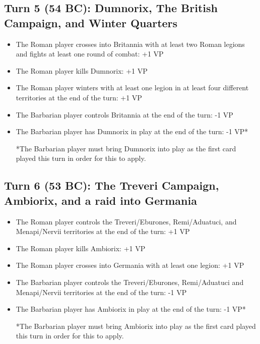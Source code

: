 \subsection{Turn 5 (54 BC): Dumnorix, The British Campaign, and Winter Quarters}
\begin{itemize}
  \setlength\itemsep{0em}
  \item The Roman player crosses into Britannia with at least two Roman legions and fights at least one round of combat: +1 VP
  \item The Roman player kills Dumnorix: +1 VP
  \item The Roman player winters with at least one legion in at least four different territories at the end of the turn: +1 VP
  \item The Barbarian player controls Britannia at the end of the turn: -1 VP
  \item The Barbarian player has Dumnorix in play at the end of the turn: -1 VP*
  
*The Barbarian player must bring Dumnorix into play as the first card played this turn in order for this to apply.
\end{itemize}

\subsection{Turn 6 (53 BC): The Treveri Campaign, Ambiorix, and a raid into Germania}
\begin{itemize}
  \setlength\itemsep{0em}
  \item The Roman player controls the Treveri/Eburones, Remi/Aduatuci, and Menapi/Nervii territories at the end of the turn: +1 VP
  \item The Roman player kills Ambiorix: +1 VP
  \item The Roman player crosses into Germania with at least one legion: +1 VP
  \item The Barbarian player controls the Treveri/Eburones, Remi/Aduatuci and Menapi/Nervii territories at the end of the turn: -1 VP
  \item The Barbarian player has Ambiorix in play at the end of the turn: -1 VP*
  
*The Barbarian player must bring Ambiorix into play as the first card played this turn in order for this to apply.
\end{itemize}

